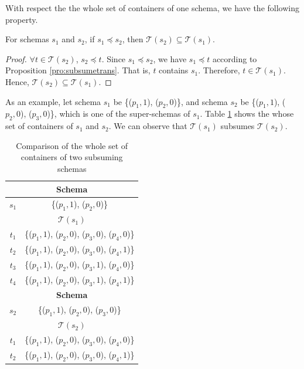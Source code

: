 With respect the the whole set of containers of one schema, we have the following property.

\begin{proposition} \label{pro:shl}
For schemas $s_{1}$ and $s_{2}$, if $s_{1} \preceq s_{2}$, then $\mathcal{T}(s_{2}) \subseteq \mathcal{T}(s_{1})$.
\end{proposition}

\begin{proof}
$\forall t \in \mathcal{T}(s_{2})$, $s_{2} \preceq t$. Since $s_{1} \preceq s_{2}$, we have $s_{1} \preceq t$ according to Proposition \ref{pro:subsumetrans}. That is, $t$ contains $s_{1}$. Therefore, $t \in \mathcal{T}(s_{1})$.  Hence,  $\mathcal{T}(s_{2}) \subseteq \mathcal{T}(s_{1})$.
\end{proof}

As an example, let schema $s_{1}$ be \{($p_{1}, 1$), ($p_{2}, 0$)\}, and schema $s_{2}$ be \{($p_{1}, 1$), ($p_{2}, 0$), ($p_{3}, 0$)\}, which is one of the super-schemas of $s_{1}$. Table \ref{ex:smallerschemahaslarger} shows the whose set of containers of  $s_{1}$ and $s_{2}$. We can observe that $\mathcal{T}(s_{1})$ subsumes  $\mathcal{T}(s_{2})$.

\begin{table}[htbp]
  \centering
  \caption{Comparison of the whole set of containers of two subsuming schemas}
      \label{ex:smallerschemahaslarger}
    \begin{tabular}{|c|c|} \hline
   \multicolumn{2}{|c|}{\textbf{Schema}} \\ \hline
   $s_{1}$ & \{($p_{1}, 1$), ($p_{2}, 0$)\} \\ \hline
   \multicolumn{2}{|c|}{\textbf{ $\mathcal{T}(s_{1})$ }}\\ \hline
   $t_{1}$ & \{($p_{1}, 1$), ($p_{2}, 0$), ($p_{3}, 0$), ($p_{4}, 0$)\} \\
   $t_{2}$ & \{($p_{1}, 1$), ($p_{2}, 0$), ($p_{3}, 0$), ($p_{4}, 1$)\} \\
   $t_{3}$ & \{($p_{1}, 1$), ($p_{2}, 0$), ($p_{3}, 1$), ($p_{4}, 0$)\} \\
   $t_{4}$ & \{($p_{1}, 1$), ($p_{2}, 0$), ($p_{3}, 1$), ($p_{4}, 1$)\} \\ \hline\hline
   \multicolumn{2}{|c|}{ \textbf{ Schema}} \\ \hline
   $s_{2}$ & \{($p_{1}, 1$), ($p_{2}, 0$), ($p_{3}, 0$)\} \\ \hline
   \multicolumn{2}{|c|}{\textbf{ $\mathcal{T}(s_{2})$ }}\\ \hline
   $t_{1}$ & \{($p_{1}, 1$), ($p_{2}, 0$), ($p_{3}, 0$), ($p_{4}, 0$)\} \\
   $t_{2}$ & \{($p_{1}, 1$), ($p_{2}, 0$), ($p_{3}, 0$), ($p_{4}, 1$)\} \\ \hline
    \end{tabular}%
\end{table}%



